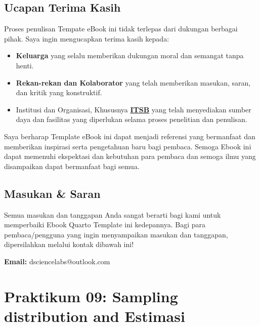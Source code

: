 \documentclass[
  indonesian,
  letterpaper,
]{book}
\providecommand{\tightlist}{%
  \setlength{\itemsep}{0pt}\setlength{\parskip}{0pt}}
\begin{document}
\section*{Ucapan Terima Kasih}\label{ucapan-terima-kasih}


Proses penulisan Tempate eBook ini tidak terlepas dari dukungan berbagai
pihak. Saya ingin mengucapkan terima kasih kepada:

\begin{itemize}
\tightlist
\item
  \textbf{Keluarga} yang selalu memberikan dukungan moral dan semangat
  tanpa henti.
\item
  \textbf{Rekan-rekan dan Kolaborator} yang telah memberikan masukan,
  saran, dan kritik yang konstruktif.
\item
  Institusi dan Organisasi, Khususnya
  \textbf{\href{https://itsb.ac.id/}{ITSB}} yang telah menyediakan
  sumber daya dan fasilitas yang diperlukan selama proses penelitian dan
  penulisan.
\end{itemize}

Saya berharap Template eBook ini dapat menjadi referensi yang bermanfaat
dan memberikan inspirasi serta pengetahuan baru bagi pembaca. Semoga
Ebook ini dapat memenuhi ekspektasi dan kebutuhan para pembaca dan
semoga ilmu yang disampaikan dapat bermanfaat bagi semua.

\section*{Masukan \& Saran}\label{masukan-saran}


Semua masukan dan tanggapan Anda sangat berarti bagi kami untuk
memperbaiki Ebook Quarto Template ini kedepannya. Bagi para
pembaca/pengguna yang ingin menyampaikan masukan dan tanggapan,
dipersilahkan melalui kontak dibawah ini!

\textbf{Email:} dsciencelabs@outlook.com


\chapter{Praktikum 09: Sampling distribution and
Estimasi}\label{praktikum-09-sampling-distribution-and-estimasi}
\end{document}
